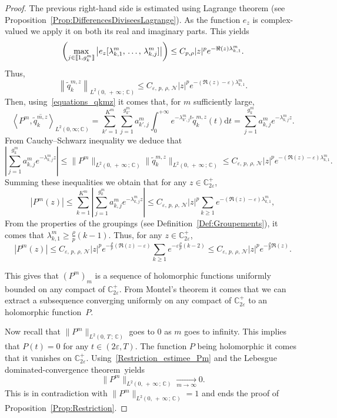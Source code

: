\documentclass[11pt]{article}
\theoremstyle{definition}
\numberwithin{equation}{section}
\numberwithin{figure}{section}
\numberwithin{table}{section}
\newcommand{\llbracket}{\mathopen{[\mkern -2.7mu[}}
\newcommand{\rrbracket}{\mathclose{]\mkern -2.7mu]}}
\newcommand{\inter}[2]{\llbracket #1,#2 \rrbracket}
\newcommand{\n}{g}
\newcommand{\NN}{\mathcal{N}}
\newcommand{\C}{\mathbb{C}}
\newcommand{\Cpeps}{\mathbb{C}^+_{2\varepsilon}}
\newcommand{\md}{\mathrm{d}}
\begin{document}
\begin{proof}
The previous right-hand side is estimated using Lagrange theorem (see Proposition~\ref{Prop:DifferencesDiviseesLagrange}). As the function $e_z$ is complex-valued we apply it on both its real and imaginary parts. This yields
\[
\left(\max_{j\in \inter{1}{\n^m_k}} \left| e_z[\lambda^m_{k,1},\,\dotsc,\,\lambda^m_{k,j}] \right| \right) \leq C_{p,\rho} |z|^p e^{-\Re(z) \lambda^m_{k,1}}.
\]
Thus,
\[
\left\| \widetilde{q}_k^{m,z}\right\|_{L^2(0,\,+\,\infty\,;\,\C)} \leq C_{\varepsilon,\,p,\,\rho,\,\NN} |z|^p e^{-(\Re(z)-\varepsilon) \lambda^m_{k,1}}.
\]
Then, using~\eqref{equations_qkmz} it comes that, for $m$ sufficiently large,
\[
\left\langle P^m, \overline{\widetilde{q}_k^{m,z}} \right\rangle_{L^2(0,\infty; \C)} = \sum_{k'=1}^{K^m} \sum_{j=1}^{\n_{k'}^m} a_{k',j}^m \int_0^{+\infty} e^{-\lambda^m_{k',j} t} \widetilde{q}_k^{m,z}(t) \md t = \sum_{j=1}^{\n_k^m} a_{k,j}^m e^{-\lambda_{k,j}^m z}.
\]
From Cauchy--Schwarz inequality we deduce that
\[
\left| \sum_{j=1}^{\n_k^m} a_{k,j}^m e^{-\lambda_{k,j}^m z} \right| \leq \| P^m \|_{L^2(0,\,+\,\infty\,;\,\C)} \| \widetilde{q}_k^{m,z} \|_{L^2(0,\,+\,\infty\,;\,\C)} \leq C_{\varepsilon,\,p,\,\rho,\,\NN} |z|^p e^{-(\Re(z)-\varepsilon) \lambda^m_{k,1}}.
\]
Summing these inequalities we obtain that for any $z \in \Cpeps$,
\[
|P^m(z)| \leq \sum_{k=1}^{K^m} \left| \sum_{j=1}^{\n_k^m} a_{k,j}^m e^{-\lambda_{k,j}^m z} \right|
\leq C_{\varepsilon,\,p,\,\rho,\,\NN} |z|^p \sum_{k\geq 1} e^{-(\Re(z)-\varepsilon) \lambda^m_{k,1}},
\]
From the properties of the groupings (see Definition~\ref{Def:Groupements}), it comes that $\lambda^m_{k,1} \geq \frac{\rho}{p} (k-1)$. Thus, for any $z \in \Cpeps$,
\begin{equation}\label{Restriction_estimee_Pm}
|P^m(z)|
\leq C_{\varepsilon,\,p,\,\rho,\,\NN} |z|^p e^{-\frac{\rho}{p} (\Re(z)-\varepsilon)} \sum_{k\geq 1} e^{-\varepsilon \frac{\rho}{p} (k-2)}
\leq C_{\varepsilon,\,p,\,\rho,\,\NN} |z|^p e^{-\frac{\rho}{p} \Re(z)}.
\end{equation}

This gives that $(P^m)_m$ is a sequence of holomorphic functions uniformly bounded on any compact of $\Cpeps$. From Montel's theorem it comes that we can extract a subsequence converging uniformly on any compact of $\Cpeps$ to an holomorphic function~$P$.

Now recall that $\|P^m\|_{L^2(0,\,T\,;\,\C)}$ goes to $0$ as $m$ goes to infinity. This implies that $P(t)=0$ for any $t \in (2 \varepsilon, T)$. The function $P$ being holomorphic it comes that it vanishes on $\Cpeps$. Using~\eqref{Restriction_estimee_Pm} and the Lebesgue dominated-convergence theorem~yields
\[
\|P^m\|_{L^2(0,\,+\,\infty\,;\,\C)} \xrightarrow[m\to \infty]{} 0.
\]
This is in contradiction with $\| P^m \|_{L^2(0,\,+\,\infty\,;\,\C)} =1$ and ends the proof of Proposition~\ref{Prop:Restriction}.
\end{proof}
\end{document}
